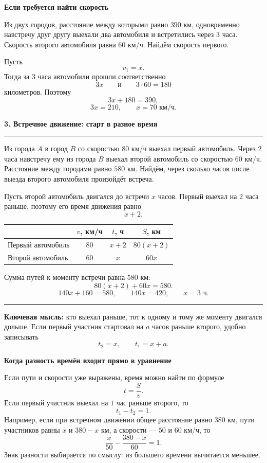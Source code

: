 \documentclass[a4paper,12pt]{article}
\newcommand{\sectiontitle}[1]{%
  \Needspace{6\baselineskip}%
  \vspace{0.25em}%
  {\Large\bfseries\color{darkaccent}#1}\par
  \vspace{0.25em}%
  \textcolor{rulegray}{\rule{\linewidth}{0.6pt}}%
  \vspace{0.35em}%
}
\newcommand{\subsectiontitle}[1]{%
  \Needspace{4\baselineskip}%
  \vspace{0.45em}%
  {\large\bfseries\color{darkaccent}#1}\par
  \vspace{0.15em}%
}
\newcommand{\important}[1]{%
  \par\vspace{0.2em}%
  \noindent
  \textcolor{accent}{\rule{2.4pt}{\baselineskip}}%
  \hspace{0.65em}%
  \begin{minipage}[t]{0.94\linewidth}
  #1
  \end{minipage}%
  \par\vspace{0.3em}%
}
\begin{document}
\subsectiontitle{Если требуется найти скорость}

Из двух городов, расстояние между которыми равно \(390\) км, одновременно навстречу
друг другу выехали два автомобиля и встретились через \(3\) часа.
Скорость второго автомобиля равна \(60\) км/ч. Найдём скорость первого.

Пусть
\[
v_1=x.
\]
Тогда за \(3\) часа автомобили прошли соответственно
\[
3x
\qquad\text{и}\qquad
3\cdot60=180
\]
километров. Поэтому
\[
3x+180=390,
\]
\[
3x=210,
\qquad
\boxed{x=70\text{ км/ч}}.
\]

\sectiontitle{3. Встречное движение: старт в разное время}

Из города \(A\) в город \(B\) со скоростью \(80\) км/ч выехал первый автомобиль.
Через \(2\) часа навстречу ему из города \(B\) выехал второй автомобиль
со скоростью \(60\) км/ч. Расстояние между городами равно \(580\) км.
Найдём, через сколько часов после выезда второго автомобиля произойдёт встреча.

Пусть второй автомобиль двигался до встречи \(x\) часов.
Первый выехал на \(2\) часа раньше, поэтому его время движения равно
\[
x+2.
\]

\begin{center}
\renewcommand{\arraystretch}{1.35}
\begin{tabular}{@{}lccc@{}}
\toprule
 & \(v\), км/ч & \(t\), ч & \(S\), км\\
\midrule
Первый автомобиль & \(80\) & \(x+2\) & \(80(x+2)\)\\
Второй автомобиль & \(60\) & \(x\) & \(60x\)\\
\bottomrule
\end{tabular}
\end{center}

Сумма путей к моменту встречи равна \(580\) км:
\[
80(x+2)+60x=580.
\]
\[
140x+160=580,
\qquad
140x=420,
\qquad
\boxed{x=3\text{ ч}}.
\]

\important{
\textbf{Ключевая мысль:} кто выехал раньше, тот к одному и тому же моменту двигался дольше.
Если первый участник стартовал на \(a\) часов раньше второго, удобно записывать
\[
t_2=x,
\qquad
t_1=x+a.
\]
}

\subsectiontitle{Когда разность времён входит прямо в уравнение}

Если пути и скорости уже выражены, время можно найти по формуле
\[
t=\frac{S}{v}.
\]
Если первый участник выехал на \(1\) час раньше второго, то
\[
\boxed{t_1-t_2=1}.
\]
Например, если при встречном движении общее расстояние равно \(380\) км,
пути участников равны \(x\) и \(380-x\) км, а скорости --- \(50\) и \(60\) км/ч, то
\[
\frac{x}{50}-\frac{380-x}{60}=1.
\]
Знак разности выбирается по смыслу: из большего времени вычитается меньшее.
\end{document}
